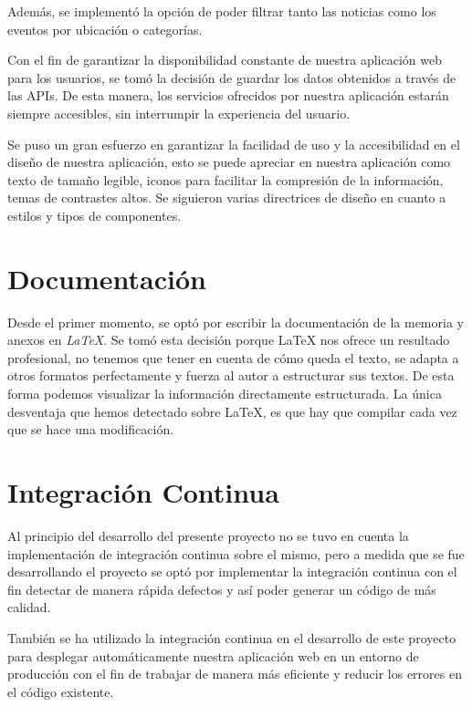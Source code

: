 
Además, se implementó la opción de poder filtrar tanto las noticias como los eventos por ubicación o categorías.

Con el fin de garantizar la disponibilidad constante de nuestra aplicación web para los usuarios, se tomó la decisión de guardar los datos obtenidos a través de las APIs. De esta manera, los servicios ofrecidos por nuestra aplicación estarán siempre accesibles, sin interrumpir la experiencia del usuario.

Se puso un gran esfuerzo en garantizar la facilidad de uso y la accesibilidad en el diseño de nuestra aplicación, esto se puede apreciar en nuestra aplicación como texto de tamaño legible, iconos para facilitar la compresión de la información, temas de contrastes altos. Se siguieron varias directrices de diseño en cuanto a estilos y tipos de componentes.

\section{Documentación}

Desde el primer momento, se optó por escribir la documentación de la memoria y anexos en \textit{LaTeX}. Se tomó esta decisión porque LaTeX nos ofrece un resultado profesional, no tenemos que tener en cuenta de cómo queda el texto, se adapta a otros formatos perfectamente y fuerza al autor a estructurar sus textos. De esta forma podemos visualizar la información directamente estructurada. La única desventaja que hemos detectado sobre LaTeX, es que hay que compilar cada vez que se hace una modificación.

\section{Integración Continua}
Al principio del desarrollo del presente proyecto no se tuvo en cuenta la implementación de integración continua sobre el mismo, pero a medida que se fue desarrollando el proyecto se optó por implementar la integración continua con el fin detectar de manera rápida defectos y  así poder generar un código de más calidad.

También se ha utilizado la integración continua en el desarrollo de este proyecto para desplegar automáticamente nuestra aplicación web en un entorno de producción con el fin de trabajar de manera más eficiente y reducir los errores en el código existente.

